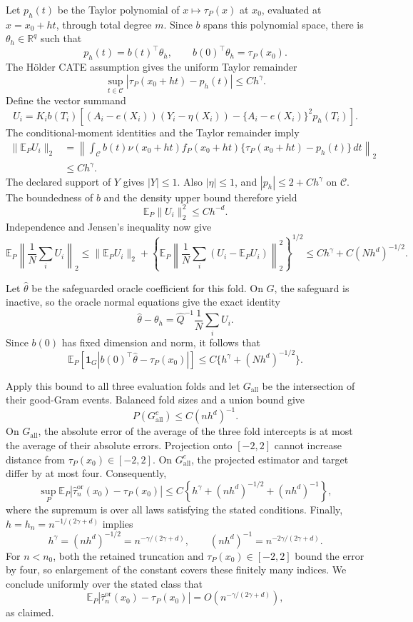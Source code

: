 Let \(p_h(t)\) be the Taylor polynomial of \(x\mapsto\tau_P(x)\) at \(x_0\), evaluated at \(x=x_0+ht\), through total degree \(m\).  Since \(b\) spans this polynomial space, there is \(\theta_h\in\mathbb R^q\) such that
\[
p_h(t)=b(t)^\top\theta_h,
\qquad
b(0)^\top\theta_h=\tau_P(x_0).
\]
The H\"older CATE assumption gives the uniform Taylor remainder
\[
\sup_{t\in\mathcal C}
|\tau_P(x_0+ht)-p_h(t)|\leq Ch^\gamma.
\]
Define the vector summand
\[
U_i=K_i b(T_i)\left[
(A_i-e(X_i))(Y_i-\eta(X_i))
-\{A_i-e(X_i)\}^2p_h(T_i)
\right].
\]
The conditional-moment identities and the Taylor remainder imply
\[
\begin{aligned}
\lVert\mathbb E_P U_i\rVert_2
&=\left\lVert
\int_{\mathcal C}b(t)\nu(x_0+ht)f_P(x_0+ht)
\{\tau_P(x_0+ht)-p_h(t)\}\,dt
\right\rVert_2\\
&\leq Ch^\gamma.
\end{aligned}
\]
The declared support of \(Y\) gives \(|Y|\leq1\).  Also \(|\eta|\leq1\), and \(|p_h|\leq2+Ch^\gamma\) on \(\mathcal C\).  The boundedness of \(b\) and the density upper bound therefore yield
\[
\mathbb E_P\lVert U_i\rVert_2^2\leq Ch^{-d}.
\]
Independence and Jensen's inequality now give
\[
\mathbb E_P\left\lVert\frac1N\sum_iU_i\right\rVert_2
\leq
\lVert\mathbb E_PU_i\rVert_2
+\left\{
\mathbb E_P\left\lVert
\frac1N\sum_i(U_i-\mathbb E_PU_i)
\right\rVert_2^2
\right\}^{1/2}
\leq Ch^\gamma+C(Nh^d)^{-1/2}.
\]

Let \(\widehat\theta\) be the safeguarded oracle coefficient for this fold.  On \(G\), the safeguard is inactive, so the oracle normal equations give the exact identity
\[
\widehat\theta-\theta_h
=\widehat Q^{-1}\frac1N\sum_iU_i.
\]
Since \(b(0)\) has fixed dimension and norm, it follows that
\[
\mathbb E_P\!\left[
\mathbf 1_G
\left|b(0)^\top\widehat\theta-\tau_P(x_0)\right|
\right]
\leq C\{h^\gamma+(Nh^d)^{-1/2}\}.
\]

Apply this bound to all three evaluation folds and let \(G_{\mathrm{all}}\) be the intersection of their good-Gram events.  Balanced fold sizes and a union bound give
\[
P(G_{\mathrm{all}}^c)\leq C(nh^d)^{-1}.
\]
On \(G_{\mathrm{all}}\), the absolute error of the average of the three fold intercepts is at most the average of their absolute errors.  Projection onto \([-2,2]\) cannot increase distance from \(\tau_P(x_0)\in[-2,2]\).  On \(G_{\mathrm{all}}^c\), the projected estimator and target differ by at most four.  Consequently,
\[
\sup_P
\mathbb E_P\left|
\widehat\tau_n^{\mathrm{or}}(x_0)-\tau_P(x_0)
\right|
\leq
C\left\{h^\gamma+(nh^d)^{-1/2}+(nh^d)^{-1}\right\},
\]
where the supremum is over all laws satisfying the stated conditions.  Finally, \(h=h_n=n^{-1/(2\gamma+d)}\) implies
\[
h^\gamma=(nh^d)^{-1/2}=n^{-\gamma/(2\gamma+d)},
\qquad
(nh^d)^{-1}=n^{-2\gamma/(2\gamma+d)}.
\]
For \(n<n_0\), both the retained truncation and \(\tau_P(x_0)\in[-2,2]\) bound the error by four, so enlargement of the constant covers these finitely many indices.  We conclude uniformly over the stated class that
\[
\mathbb E_P\left|
\widehat\tau_n^{\mathrm{or}}(x_0)-\tau_P(x_0)
\right|
=O\!\left(n^{-\gamma/(2\gamma+d)}\right),
\]
as claimed.